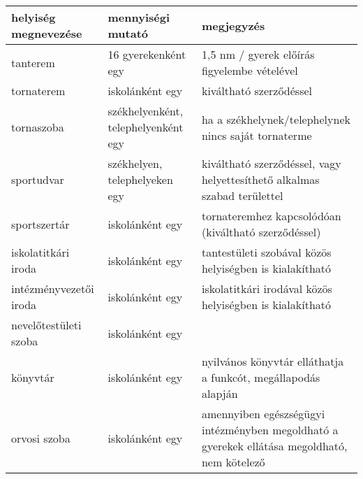\begin{table}[thb]

\begin{center}
\begin{tabular}{@{}p{4cm}|p{4cm}|p{6cm}@{}}

\textbf{helyiség megnevezése}   & \textbf{mennyiségi mutató}                       & \textbf{megjegyzés}                                                                                      \\ \hline
tanterem               & 16 gyerekenként egy                       & 1,5 nm / gyerek előírás figyelembe vételével                                                    \\ \hline
tornaterem             & iskolánként egy                           & kiváltható szerződéssel                                                                         \\ \hline
tornaszoba             & székhelyenként, telephelyenként egy       & ha a székhelynek/telephelynek nincs saját tornaterme                                            \\ \hline
sportudvar             & székhelyen, telephelyeken egy             & kiváltható szerződéssel, vagy helyettesíthető alkalmas szabad területtel                        \\ \hline
sportszertár           & iskolánként egy                           & tornateremhez kapcsolódóan (kiváltható szerződéssel)                                            \\ \hline
iskolatitkári iroda    & iskolánként egy                           & tantestületi szobával közös helyiségben  is kialakítható                                        \\ \hline
intézményvezetői iroda & iskolánként egy                           & iskolatitkári irodával közös helyiségben is kialakítható                                        \\ \hline
nevelőtestületi szoba  & iskolánként egy                           &                                                                                                 \\ \hline
könyvtár               & iskolánként egy                           & nyilvános könyvtár elláthatja a funkcót, megállapodás alapján                                   \\ \hline
orvosi szoba           & iskolánként egy                           & amennyiben egészségügyi intézményben megoldható a gyerekek ellátása megoldható, nem kötelező    \\ \hline

\end{tabular}
\end{center}
\end{table}
